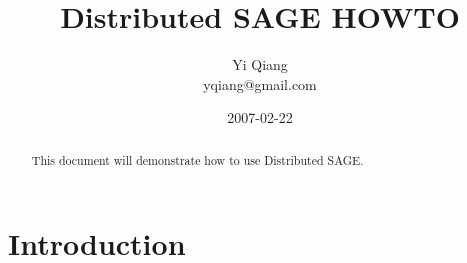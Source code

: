 \documentclass[]{howto}
\title{Distributed SAGE HOWTO}
\author{
    Yi Qiang\\
    yqiang@gmail.com
}
\date{2007-02-22}
\begin{document}
\maketitle

\begin{abstract}
    This document will demonstrate how to use Distributed SAGE.
\end{abstract}

\section{Introduction}
\end{document}
